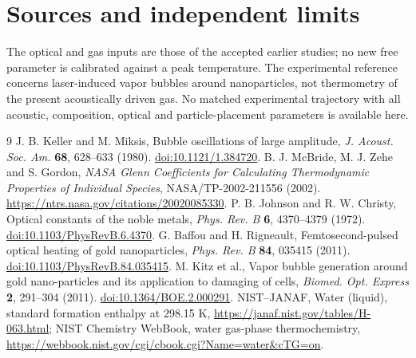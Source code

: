 \documentclass[10pt,letterpaper]{article}
\begin{document}
\section{Sources and independent limits}
The optical and gas inputs are those of the accepted earlier studies; no new free parameter is calibrated against a peak temperature. The experimental reference \cite{kitz} concerns laser-induced vapor bubbles around nanoparticles, not thermometry of the present acoustically driven gas. No matched experimental trajectory with all acoustic, composition, optical and particle-placement parameters is available here.
\begin{thebibliography}{9}
 J. B. Keller and M. Miksis, Bubble oscillations of large amplitude, \emph{J. Acoust. Soc. Am.} \textbf{68}, 628--633 (1980). \href{https://doi.org/10.1121/1.384720}{doi:10.1121/1.384720}.
 B. J. McBride, M. J. Zehe and S. Gordon, \emph{NASA Glenn Coefficients for Calculating Thermodynamic Properties of Individual Species}, NASA/TP-2002-211556 (2002). \url{https://ntrs.nasa.gov/citations/20020085330}.
 P. B. Johnson and R. W. Christy, Optical constants of the noble metals, \emph{Phys. Rev. B} \textbf{6}, 4370--4379 (1972). \href{https://doi.org/10.1103/PhysRevB.6.4370}{doi:10.1103/PhysRevB.6.4370}.
 G. Baffou and H. Rigneault, Femtosecond-pulsed optical heating of gold nanoparticles, \emph{Phys. Rev. B} \textbf{84}, 035415 (2011). \href{https://doi.org/10.1103/PhysRevB.84.035415}{doi:10.1103/PhysRevB.84.035415}.
 M. Kitz et al., Vapor bubble generation around gold nano-particles and its application to damaging of cells, \emph{Biomed. Opt. Express} \textbf{2}, 291--304 (2011). \href{https://doi.org/10.1364/BOE.2.000291}{doi:10.1364/BOE.2.000291}.
 NIST--JANAF, Water (liquid), standard formation enthalpy at 298.15 K, \url{https://janaf.nist.gov/tables/H-063.html}; NIST Chemistry WebBook, water gas-phase thermochemistry, \url{https://webbook.nist.gov/cgi/cbook.cgi?Name=water\&cTG=on}.
\end{thebibliography}
\end{document}
